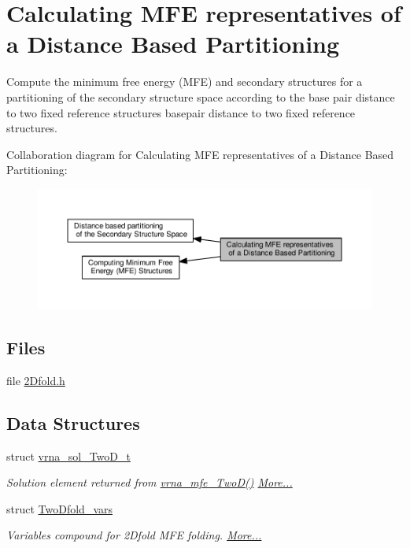 \hypertarget{group__kl__neighborhood__mfe}{}\section{Calculating M\+FE representatives of a Distance Based Partitioning}
\label{group__kl__neighborhood__mfe}


Compute the minimum free energy (M\+FE) and secondary structures for a partitioning of the secondary structure space according to the base pair distance to two fixed reference structures basepair distance to two fixed reference structures.  


Collaboration diagram for Calculating M\+FE representatives of a Distance Based Partitioning\+:
\nopagebreak
\begin{figure}[H]
\begin{center}
\leavevmode
\includegraphics[width=350pt]{group__kl__neighborhood__mfe}
\end{center}
\end{figure}
\subsection*{Files}
\begin{DoxyCompactItemize}
\item 
file \hyperlink{2Dfold_8h}{2\+Dfold.\+h}
\end{DoxyCompactItemize}
\subsection*{Data Structures}
\begin{DoxyCompactItemize}
\item 
struct \hyperlink{group__kl__neighborhood__mfe_structvrna__sol__TwoD__t}{vrna\+\_\+sol\+\_\+\+Two\+D\+\_\+t}
\begin{DoxyCompactList}\small\item\em Solution element returned from \hyperlink{group__kl__neighborhood__mfe_ga243c288b463147352829df04de6a2f77}{vrna\+\_\+mfe\+\_\+\+Two\+D()}  \hyperlink{group__kl__neighborhood__mfe_structvrna__sol__TwoD__t}{More...}\end{DoxyCompactList}\item 
struct \hyperlink{group__kl__neighborhood__mfe_structTwoDfold__vars}{Two\+Dfold\+\_\+vars}
\begin{DoxyCompactList}\small\item\em Variables compound for 2\+Dfold M\+FE folding.  \hyperlink{group__kl__neighborhood__mfe_structTwoDfold__vars}{More...}\end{DoxyCompactList}\end{DoxyCompactItemize}
